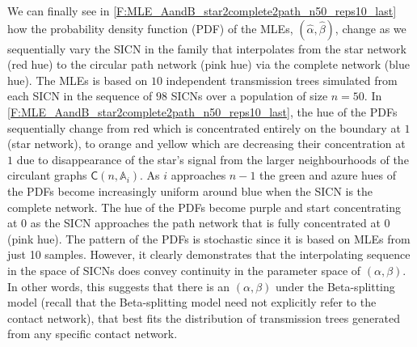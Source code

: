 \documentclass[review]{elsarticle}
\numberwithin{equation}{section}
\let\orgautoref\autoref
\renewcommand{\autoref}
        {\def\equationautorefname{Eq.}%
         \def\figureautorefname{Fig.}%
         \def\subfigureautorefname{Fig.}%
         \def\sectionautorefname{Sect.}%
         \def\subsectionautorefname{Sect.}%
         \def\subsubsectionautorefname{Sect.}%
         \def\Itemautorefname{item}%
         \def\tableautorefname{Table}%
         \def\propositionautorefname{Prop.}%
         \def\corollaryautorefname{Corollary}%
         \def\theoremautorefname{Theorem}%
         \def\remarkautorefname{Remark}%
         \def\lemmaautorefname{Lemma}%
         \def\proofofautorefname{Proof}%
         \def\exampleautorefname{Example}%
         \orgautoref}
\begin{document}
We can finally see in \autoref{F:MLE_AandB_star2complete2path_n50_reps10_last} how the probability density function (PDF) of the MLEs, $(\widehat{\alpha},\widehat{\beta})$, change as we sequentially vary the SICN in the family that interpolates from the star network (red hue) to the circular path network (pink hue) via the complete network (blue hue).  
The MLEs is based on $10$ independent transmission trees simulated from each SICN in the sequence of $98$ SICNs over a population of size $n=50$.  
In \autoref{F:MLE_AandB_star2complete2path_n50_reps10_last}, the hue of the PDFs sequentially change from red which is concentrated entirely on the boundary at $1$ (star network), to orange and yellow which are decreasing their concentration at $1$ due to disappearance of the star's signal from the larger neighbourhoods of the circulant graphs $\mathsf{C}(n,\mathbb{A}_i)$.  
As $i$ approaches $n-1$ the green and azure hues of the PDFs become increasingly uniform around blue when the SICN is the complete network.  
The hue of the PDFs become purple and start concentrating at $0$ as the SICN approaches the path network that is fully concentrated at $0$ (pink hue). 
The pattern of the PDFs is stochastic since it is based on MLEs from just 10 samples.  
However, it clearly demonstrates that the interpolating sequence in the space of SICNs does convey continuity in the parameter space of $(\alpha,\beta)$.
In other words, this suggests that there is an $(\alpha,\beta)$ under the Beta-splitting model (recall that the Beta-splitting model need not explicitly refer to the contact network), that best fits the distribution of transmission trees generated from any specific contact network.  
\end{document}
